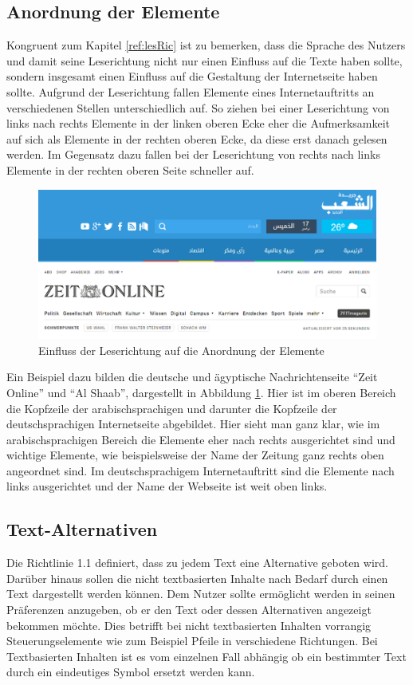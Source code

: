 \documentclass[12pt, paper=a4, bibtotoc, toc=listof, headsepline=true]{scrreprt}
\begin{document}
\subsection{Anordnung der Elemente}
Kongruent zum Kapitel \ref{ref:lesRic} ist zu bemerken, dass die Sprache des Nutzers und damit seine Leserichtung nicht nur einen Einfluss auf die Texte haben sollte, sondern insgesamt einen Einfluss auf die Gestaltung der Internetseite haben sollte. Aufgrund der Leserichtung fallen Elemente eines Internetauftritts an verschiedenen Stellen unterschiedlich auf. So ziehen bei einer Leserichtung von links nach rechts Elemente in der linken oberen Ecke eher die Aufmerksamkeit auf sich als Elemente in der rechten oberen Ecke, da diese erst danach gelesen werden. Im Gegensatz dazu fallen bei der Leserichtung von rechts nach links Elemente in der rechten oberen Seite schneller auf\cite[S.47 f.]{meidl2013global}.
\begin{figure}
	\centering
	\includegraphics[width=\textwidth,height=\textheight,keepaspectratio]{leserichtung.png}
	\caption[Einfluss der Leserichtung auf Anordnung der Elemente]{Einfluss der Leserichtung auf die Anordnung der Elemente\cite{elShaab}\cite{zeitOnline}}
	\label{img:lesRic}
\end{figure}
Ein Beispiel dazu bilden die deutsche und ägyptische Nachrichtenseite \enquote{Zeit Online} und \enquote{Al Shaab}, dargestellt in Abbildung  \ref{img:lesRic}. Hier ist im oberen Bereich die Kopfzeile der arabischsprachigen und darunter die Kopfzeile der deutschsprachigen Internetseite abgebildet. Hier sieht man ganz klar, wie im arabischsprachigen Bereich die Elemente eher nach rechts ausgerichtet sind und wichtige Elemente, wie beispielsweise der Name der Zeitung ganz rechts oben angeordnet sind. Im deutschsprachigem Internetauftritt sind die Elemente nach links ausgerichtet und der Name der Webseite ist weit oben links.
\subsection{Text-Alternativen}
Die Richtlinie 1.1 definiert, dass zu jedem Text eine Alternative geboten wird. Darüber hinaus sollen die nicht textbasierten Inhalte nach Bedarf durch einen Text dargestellt werden können. Dem Nutzer sollte ermöglicht werden in seinen Präferenzen anzugeben, ob er den Text oder dessen Alternativen angezeigt bekommen möchte. Dies betrifft bei nicht textbasierten Inhalten vorrangig Steuerungselemente wie zum Beispiel Pfeile in verschiedene Richtungen. Bei Textbasierten Inhalten ist es vom einzelnen Fall abhängig ob ein bestimmter Text durch ein eindeutiges Symbol ersetzt werden kann.
\end{document}

